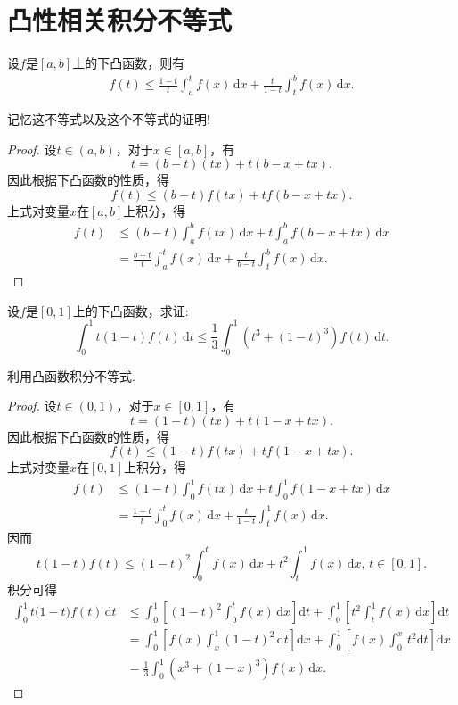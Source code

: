 \documentclass[../../main.tex]{subfiles}
\begin{document}
\section{凸性相关积分不等式}

\begin{proposition}\label{proposition:凸性积分不等式}
设\( f \)是\([a,b]\)上的下凸函数，则有
\begin{align*}
f(t) \leqslant \frac{1-t}{t} \int_a^t f(x)\,\text{d}x + \frac{t}{1-t}\int_t^b f(x)\,\text{d}x.
\end{align*}
\end{proposition}
\begin{note}
记忆这不等式以及这个不等式的证明!
\end{note}
\begin{proof}
设\( t \in (a,b) \)，对于\( x \in [a,b] \)，有
\[
t = (b-t)(tx) + t(b - x + tx).
\]
因此根据下凸函数的性质，得
\[
f(t) \leqslant (b-t)f(tx) + tf(b - x + tx).
\]
上式对变量\( x \)在\([a,b]\)上积分，得
\begin{align*}
f(t) &\leqslant (b-t)\int_a^b f(tx)\,\text{d}x + t\int_a^b f(b - x + tx)\,\text{d}x \\
&= \frac{b-t}{t} \int_a^t f(x)\,\text{d}x + \frac{t}{b-t}\int_t^b f(x)\,\text{d}x.
\end{align*}

\end{proof}

\begin{example}
设\( f \)是\([0,1]\)上的下凸函数，求证:
\[
\int_0^1 t(1-t)f(t)\,\text{d}t \leq \frac{1}{3}\int_0^1 \left(t^3 + (1-t)^3\right)f(t)\,\text{d}t.
\]
\end{example}
\begin{note}
利用凸函数积分不等式.
\end{note}
\begin{proof}
设\( t \in (0,1) \)，对于\( x \in [0,1] \)，有
\[
t = (1-t)(tx) + t(1 - x + tx).
\]
因此根据下凸函数的性质，得
\[
f(t) \leq (1-t)f(tx) + tf(1 - x + tx).
\]
上式对变量\( x \)在\([0,1]\)上积分，得
\begin{align*}
f(t) &\leq (1-t)\int_0^1 f(tx)\,\text{d}x + t\int_0^1 f(1 - x + tx)\,\text{d}x \\
&= \frac{1-t}{t} \int_0^t f(x)\,\text{d}x + \frac{t}{1-t}\int_t^1 f(x)\,\text{d}x.
\end{align*}
因而
\[
t(1-t)f(t) \leq (1-t)^2\int_0^t f(x)\,\text{d}x + t^2\int_t^1 f(x)\,\text{d}x, \, t \in [0,1].
\]
积分可得
\begin{align*}
\int_0^1{t(1}-t)f(t)\,\mathrm{d}t&\leqslant \int_0^1{\left[ (1-t)^2\int_0^t{f(x)\,\mathrm{d}x} \right] \mathrm{d}t}+\int_0^1{\left[ t^2\int_t^1{f(x)\,\mathrm{d}x} \right] \mathrm{d}t}
\\
&=\int_0^1{\left[ f\left( x \right) \int_x^1{(1-t)^2\,\mathrm{d}t} \right] \mathrm{d}x}+\int_0^1{\left[ f(x)\int_0^x{\,t^2\mathrm{d}t} \right] \mathrm{d}x}
\\
&=\frac{1}{3}\int_0^1{\left( x^3+(1-x)^3 \right) f(x)\,\mathrm{d}x}.
\end{align*}

\end{proof}
\end{document}
